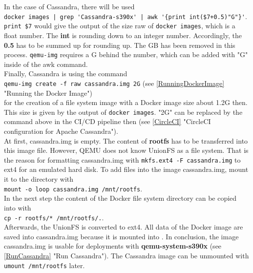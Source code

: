 In the case of Cassandra, there will be used \\
\lstinline!docker images | grep 'Cassandra-s390x' | awk '{print int($7+0.5)"G"}'!. \\
\lstinline!print $7! would give the output of the size raw of \lstinline!docker images!, which is a float number. The \textbf{int} is rounding down to an integer number. Accordingly, the \textbf{0.5} has to be summed up for rounding up. The GB has been removed in this process. \lstinline!qemu-img! requires a G behind the number, which can be added with "G" inside of the awk command. \\

Finally, Cassandra is using the command \\
\lstinline!qemu-img create -f raw cassandra.img 2G! (see \ref{RunningDockerImage} "Running the Docker Image") \\
for the creation of a file system image with a Docker image size about 1.2G then. This size is given by the output of \lstinline!docker images!.  "2G" can be replaced by the command above in the \gls{CI/CD} pipeline then (see \ref{CircleCI} "CircleCI configuration for Apache Cassandra"). \\
At first, cassandra.img is empty. The content of \textbf{rootfs} has to be transferred into this image file. However, \gls{QEMU} does not know UnionFS as a file system. That is the reason for formatting cassandra.img with \lstinline!mkfs.ext4 -F cassandra.img! to ext4 for an emulated hard disk. To add files into the image cassandra.img, mount it to the directory  with \\
\lstinline!mount -o loop cassandra.img /mnt/rootfs!. \\ 
In the next step the content of the Docker file system directory can be copied into  with \\ 
\lstinline!cp -r rootfs/* /mnt/rootfs/.!. \\ 
Afterwards, the UnionFS is converted to ext4. All data of the Docker image are saved into cassandra.img because it is mounted into . In conclusion, the image cassandra.img is usable for deployments with \textbf{qemu-system-s390x} (see \ref{RunCassandra} "Run Cassandra"). 
The Cassandra image can be unmounted with \lstinline!umount /mnt/rootfs! later.
